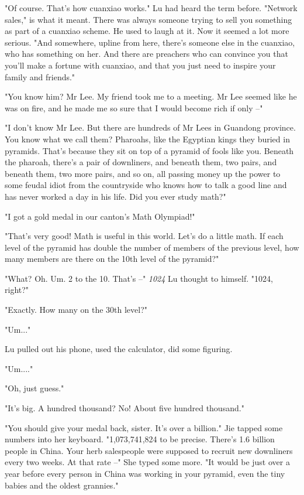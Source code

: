 "Of course. That's how cuanxiao works." Lu had heard the term
before. "Network sales," is what it meant. There was always someone
trying to sell you something as part of a cuanxiao scheme. He used
to laugh at it. Now it seemed a lot more serious. "And somewhere,
upline from here, there's someone else in the cuanxiao, who has
something on her. And there are preachers who can convince you that
you'll make a fortune with cuanxiao, and that you just need to
inspire your family and friends."

"You know him? Mr Lee. My friend took me to a meeting. Mr Lee
seemed like he was on fire, and he made me so sure that I would
become rich if only --"

"I don't know Mr Lee. But there are hundreds of Mr Lees in Guandong
province. You know what we call them? Pharoahs, like the Egyptian
kings they buried in pyramids. That's because they sit on top of a
pyramid of fools like you. Beneath the pharoah, there's a pair of
downliners, and beneath them, two pairs, and beneath them, two more
pairs, and so on, all passing money up the power to some feudal
idiot from the countryside who knows how to talk a good line and
has never worked a day in his life. Did you ever study math?"

"I got a gold medal in our canton's Math Olympiad!"

"That's very good! Math is useful in this world. Let's do a little
math. If each level of the pyramid has double the number of members
of the previous level, how many members are there on the 10th level
of the pyramid?"

"What? Oh. Um. 2 to the 10. That's --" \emph{1024} Lu thought to
himself. "1024, right?"

"Exactly. How many on the 30th level?"

"Um..."

Lu pulled out his phone, used the calculator, did some figuring.

"Um...."

"Oh, just guess."

"It's big. A hundred thousand? No! About five hundred thousand."

"You should give your medal back, sister. It's over a billion." Jie
tapped some numbers into her keyboard. "1,073,741,824 to be
precise. There's 1.6 billion people in China. Your herb salespeople
were supposed to recruit new downliners every two weeks. At that
rate --" She typed some more. "It would be just over a year before
every person in China was working in your pyramid, even the tiny
babies and the oldest grannies."


